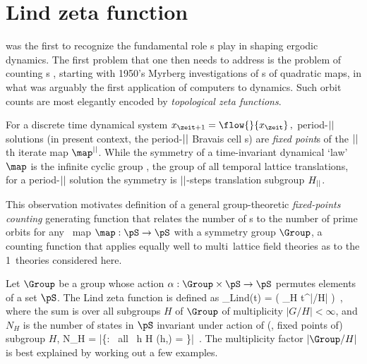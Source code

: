 

\section{Lind zeta function}
\label{sect:LC21Lind1d}

\Poincare{} was the first to  recognize the fundamental role
{\po}s play in shaping ergodic dynamics. The first problem that one then
needs to address is the problem of counting {\po}s%
, starting with 1950's
 {Myrberg}
investigations of {\po}s of quadratic maps, in what was arguably the
first application of computers to
dynamics.
Such orbit counts are most elegantly encoded by \emph{topological zeta
functions}.

For a discrete time dynamical system
\(
\ssp_{\zeit+1}=\flow{}{\ssp_{\zeit}}
\,,\)
period-${||}$ solutions (in present context, the period-${||}$ Bravais
cell {\lattstate}s) are \emph{fixed point}s of the ${||}$th iterate map
$\map^\cl{}$.
While the symmetry of a time-invariant dynamical `law' $\map$ is
the {infinite cyclic group} \Cn{\infty},
the group of all temporal lattice translations, for a period-${||}$
solution the symmetry is ${||}$-steps translation subgroup $H_{{||}}$.

This observation motivates definition of a general group-theoretic
\emph{fixed-points counting} generating  function that relates the number
of {\lattstate}s to the number of prime orbits for any \statesp\ map
\(
\map : \pS \to \pS
\)
with a symmetry group $\Group$, a counting function that applies equally
well to multi\dmn\ lattice field theories as to the 1\dmn\
theories considered here.

Let $\Group$ be a group whose action
$\alpha: \Group \times \pS \to \pS$
permutes elements of a set $\pS$.
The Lind zeta function is defined as
\beq
\zeta_{Lind}(t) =
\exp \left( \sum_{H} \;
            t^{|\Group/H|}
      \right)
\,,
where the sum is over all subgroups $H$ of $\Group$
of multiplicity $|G/H| < \infty$, and $N_{H}$ is the number of states
in $\pS$ invariant under action of (\ie, fixed points of) subgroup $H$,
\beq
N_{H} =
   |\{\Xx \in \pS : \mbox{ all } h \in H \quad \alpha(h,\Xx) = \Xx\}|
\,.
The multiplicity factor $|\Group/{H}|$ is best explained by working out a
few examples.

